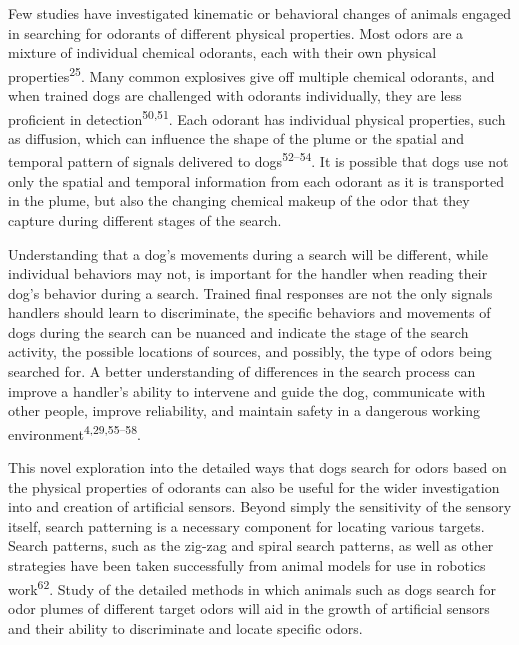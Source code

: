 \documentclass[
]{article}
\begin{document}
Few studies have investigated kinematic or behavioral changes of animals engaged in searching for odorants of different physical properties. Most odors are a mixture of individual chemical odorants, each with their own physical properties\textsuperscript{25}. Many common explosives give off multiple chemical odorants, and when trained dogs are challenged with odorants individually, they are less proficient in detection\textsuperscript{50,51}. Each odorant has individual physical properties, such as diffusion, which can influence the shape of the plume or the spatial and temporal pattern of signals delivered to dogs\textsuperscript{52--54}. It is possible that dogs use not only the spatial and temporal information from each odorant as it is transported in the plume, but also the changing chemical makeup of the odor that they capture during different stages of the search.

Understanding that a dog's movements during a search will be different, while individual behaviors may not, is important for the handler when reading their dog's behavior during a search. Trained final responses are not the only signals handlers should learn to discriminate, the specific behaviors and movements of dogs during the search can be nuanced and indicate the stage of the search activity, the possible locations of sources, and possibly, the type of odors being searched for. A better understanding of differences in the search process can improve a handler's ability to intervene and guide the dog, communicate with other people, improve reliability, and maintain safety in a dangerous working environment\textsuperscript{4,29,55--58}.

This novel exploration into the detailed ways that dogs search for odors based on the physical properties of odorants can also be useful for the wider investigation into and creation of artificial sensors. Beyond simply the sensitivity of the sensory itself, search patterning is a necessary component for locating various targets. Search patterns, such as the zig-zag and spiral search patterns, as well as other strategies have been taken successfully from animal models for use in robotics work\textsuperscript{62}. Study of the detailed methods in which animals such as dogs search for odor plumes of different target odors will aid in the growth of artificial sensors and their ability to discriminate and locate specific odors.
\end{document}
